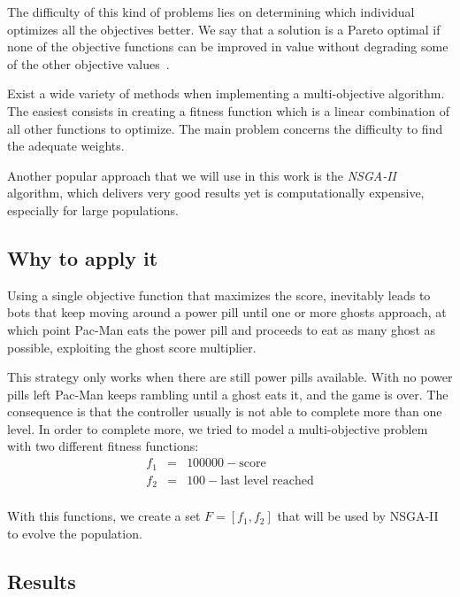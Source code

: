\documentclass{llncs}
\newcommand{\paco}{Pac-Man }
\begin{document}
The difficulty of this kind of problems lies on determining which individual optimizes all the objectives better. We say that a solution is a Pareto optimal if none of the objective functions can be improved in value without degrading some of the other objective values~\cite{cervigon}. 

Exist a wide variety of methods when implementing a multi-objective algorithm. The easiest consists in creating a fitness function which is a linear combination of all other functions to optimize. The main problem concerns the difficulty to find the adequate weights.

Another popular approach that we will use in this work is the \textit{NSGA-II}~\cite{nsgapaper} algorithm, which delivers very good results yet is computationally expensive, especially for large populations.

\subsection{Why to apply it}

Using a single objective function that maximizes the score, inevitably leads to bots that keep moving around a power pill until one or more ghosts approach, at which point \paco eats the power pill and proceeds to eat as many ghost as possible, exploiting the ghost score multiplier.

This strategy only works when there are still power pills available. With no power pills left \paco keeps rambling until a ghost eats it, and the game is over. The consequence is that the controller usually is not able to complete more than one level. In order to complete more, we tried to model a multi-objective problem with two different fitness functions:
\begin{eqnarray*}
f_1 & = & 100000 - \text{score}\\
f_2 & = & 100 - \text{last level reached}\\
\end{eqnarray*}

With this functions, we create a set $F = [f_1, f_2]$ that will be used by NSGA-II to evolve the population.

\subsection{Results}
\end{document}
